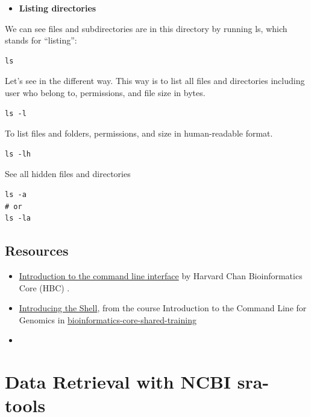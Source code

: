 \documentclass[
  letterpaper,
  DIV=11,
  numbers=noendperiod]{scrreprt}
\providecommand{\tightlist}{%
  \setlength{\itemsep}{0pt}\setlength{\parskip}{0pt}}\usepackage{longtable,booktabs,array}
\begin{document}
\begin{itemize}
\tightlist
\item
  \textbf{Listing directories}
\end{itemize}

We can see files and subdirectories are in this directory by running ls,
which stands for ``listing'':

\begin{verbatim}
ls
\end{verbatim}

Let's see in the different way. This way is to list all files and
directories including user who belong to, permissions, and file size in
bytes.

\begin{verbatim}
ls -l
\end{verbatim}

To list files and folders, permissions, and size in human-readable
format.

\begin{verbatim}
ls -lh
\end{verbatim}

See all hidden files and directories

\begin{verbatim}
ls -a
# or
ls -la
\end{verbatim}

\hypertarget{resources}{%
\section{Resources}\label{resources}}

\begin{itemize}
\item
  \href{https://hbctraining.github.io/Intro-to-shell-flipped/}{Introduction
  to the command line interface} by Harvard Chan Bioinformatics Core
  (HBC) .
\item
  \href{https://bioinformatics-core-shared-training.github.io/shell-genomics/01-introduction/index.html}{Introducing
  the Shell}, from the course Introduction to the Command Line for
  Genomics in
  \href{https://bioinformatics-core-shared-training.github.io/}{bioinformatics-core-shared-training}
\item
\end{itemize}


\hypertarget{data-retrieval-with-ncbi-sra-tools}{%
\chapter{Data Retrieval with NCBI
sra-tools}\label{data-retrieval-with-ncbi-sra-tools}}
\end{document}
